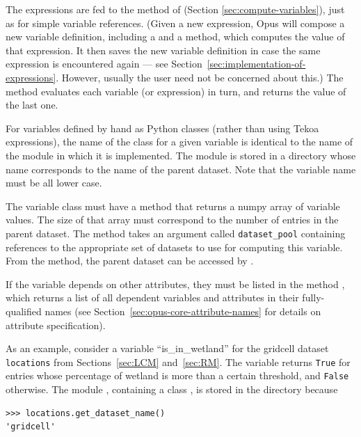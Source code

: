 The expressions are fed to the  method 
 of
 (Section \ref{sec:compute-variables}), just as for simple
variable references.  (Given a new expression, Opus will compose a
new variable definition, including a  and a
 method, which computes the value of that expression.
It then saves the new variable definition in case the same expression is
encountered again --- see Section~\ref{sec:implementation-of-expressions}.
However, usually the user need not
be concerned about this.)  The  method evaluates
each variable (or expression) in turn, and returns the value of the last one.

For variables defined by hand as Python classes (rather than using Tekoa expressions), the
name of the class for a given variable is identical to the name of the module 
in which it is implemented.
The module is stored in a directory whose name corresponds to the name of
the parent dataset. Note that the variable 
name must be all lower case.

The variable class must have a method  
that returns a numpy array of
variable values. The size of that array must correspond to the number of entries in the parent
dataset. The  method takes an argument called
\verb|dataset_pool| containing references to the appropriate set of datasets to
use for computing this variable. From the  method, the parent dataset can be
accessed  by .

If the variable depends on other attributes, they must be listed in the method
, which returns a list of all dependent variables and
attributes in their fully-qualified names (see
Section~\ref{sec:opus-core-attribute-names} for details on attribute
specification).

As an example, consider a variable ``is_in_wetland'' for the gridcell dataset
\verb|locations| from Sections~\ref{sec:LCM} and~\ref{sec:RM}. The variable
returns \verb|True| for entries whose percentage of wetland is more than a certain
threshold, and \verb|False| otherwise. The module ,
containing a class , is stored in the directory
 because
\begin{verbatim}
>>> locations.get_dataset_name()
'gridcell'
\end{verbatim}

